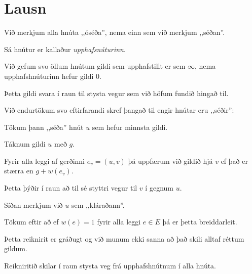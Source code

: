 \section{Lausn}
{
    {
        \item<1-> Við merkjum alla hnúta ,,óséða'', nema einn sem við merkjum ,,séðan''.
        \item<2-> Sá hnútur er kallaður \emph{upphafsnúturinn}.
        \item<3-> Við gefum svo öllum hnútum gildi sem upphafstillt er sem $\infty$, nema upphafshnúturinn hefur gildi $0$.
        \item<4-> Þetta gildi svara í raun til stysta vegur sem við höfum fundið hingað til.
        \item<5-> Við endurtökum svo eftirfarandi skref þangað til engir hnútar eru ,,séðir'':
        {
            \item<6-> Tökum þann ,,séða'' hnút $u$ sem hefur minnsta gildi.
            \item<7-> Táknum gildi $u$ með $g$.
            \item<8-> Fyrir alla leggi af gerðinni $e_v = (u, v)$ þá uppfærum við gildið hjá $v$ ef það er stærra en $g + w(e_v)$.
            \item<9-> Þetta þýðir í raun að til sé styttri vegur til $v$ í gegnum $u$.
            \item<10-> Síðan merkjum við $u$ sem ,,kláraðann''.
        }
    }
}

{
    {
        \item<1-> Tökum eftir að ef $w(e) = 1$ fyrir alla leggi $e \in E$ þá er þetta breiddarleit.
        \item<2-> Þetta reiknirit er gráðugt og við munum ekki sanna að það skili alltaf réttum gildum.
        \item<3-> Reikniritið skilar í raun stysta veg frá upphafshnútnum í alla hnúta.
    }
}

